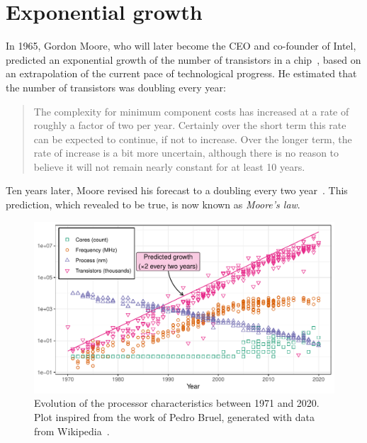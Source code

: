     \section{Exponential growth}%
    \label{sec:exponential_growth}

        In 1965, Gordon Moore, who will later become the CEO and co-founder of Intel, predicted an exponential growth of
        the number of transistors in a chip~\cite{moore:1965}, based on an extrapolation of the current pace of
        technological progress. He estimated that the number of transistors was doubling every year:
        \begin{quote}
            The complexity for minimum component costs has increased at a rate of roughly a factor of two per year.
            Certainly over the short term this rate can be expected to continue, if not to increase. Over the longer
            term, the rate of increase is a bit more uncertain, although there is no reason to believe it will not
            remain nearly constant for at least 10 years.
        \end{quote}

        Ten years later, Moore revised his forecast to a doubling every two year~\cite{moore:1975}. This prediction,
        which revealed to be true, is now known as \emph{Moore's law}.

        \begin{figure}[htbp]
            \centering
            \includegraphics[width=\textwidth]{img/context/49_years.pdf}
            \caption{\label{fig:context:49_years}
            Evolution of the processor characteristics between 1971 and 2020. Plot inspired from the work of Pedro Bruel,
            generated with data from Wikipedia~\cite{wiki2021chronology,wiki2021transistor}.}
        \end{figure}

